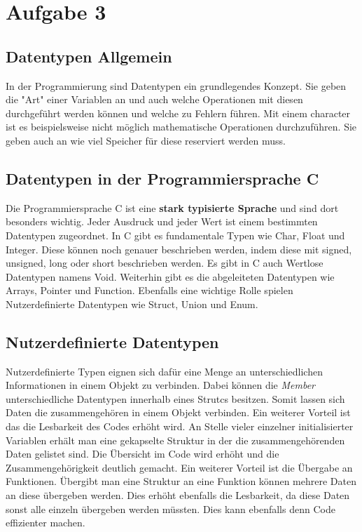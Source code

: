 \chapter{Aufgabe 3}
\section{Datentypen Allgemein}
In der Programmierung sind Datentypen ein grundlegendes Konzept.
Sie geben die "Art" einer Variablen an und auch welche Operationen mit diesen durchgeführt werden können und welche zu Fehlern führen.
Mit einem character ist es beispielsweise nicht möglich mathematische Operationen durchzuführen.
Sie geben auch an wie viel Speicher für diese reserviert werden muss. 

\section{Datentypen in der Programmiersprache C}
Die Programmiersprache C ist eine \textbf{stark typisierte Sprache} und sind dort besonders wichtig.
Jeder Ausdruck und jeder Wert ist einem bestimmten Datentypen zugeordnet.
In C gibt es fundamentale Typen wie Char, Float und Integer.
Diese können noch genauer beschrieben werden, indem diese mit signed, unsigned, long oder short beschrieben werden.
Es gibt in C auch Wertlose Datentypen namens Void.
Weiterhin gibt es die abgeleiteten Datentypen wie Arrays, Pointer und Function.
Ebenfalls eine wichtige Rolle spielen Nutzerdefinierte Datentypen wie Struct, Union und Enum.

\section{Nutzerdefinierte Datentypen}
Nutzerdefinierte Typen eignen sich dafür eine Menge an unterschiedlichen Informationen in einem Objekt zu verbinden.
Dabei können die \textit{Member} unterschiedliche Datentypen innerhalb eines Strutcs besitzen.
Somit lassen sich Daten die zusammengehören in einem Objekt verbinden.
Ein weiterer Vorteil ist das die Lesbarkeit des Codes erhöht wird.
An Stelle vieler einzelner initialisierter Variablen erhält man eine gekapselte Struktur in der die zusammengehörenden Daten gelistet sind.
Die Übersicht im Code wird erhöht und die Zusammengehörigkeit deutlich gemacht.
Ein weiterer Vorteil ist die Übergabe an Funktionen.
Übergibt man eine Struktur an eine Funktion können mehrere Daten an diese übergeben werden.
Dies erhöht ebenfalls die Lesbarkeit, da diese Daten sonst alle einzeln übergeben werden müssten.
Dies kann ebenfalls denn Code effizienter machen.

